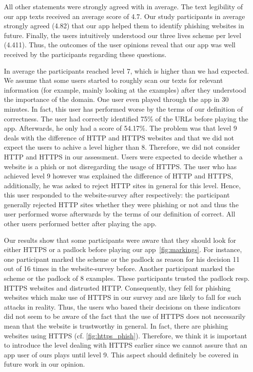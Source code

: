 \begin{description}[leftmargin=0cm]
	All other statements were strongly agreed with in average.
	The text legibility of our app texts received an average score of 4.7.
	Our study participants in average strongly agreed (4.82) that our app helped them to identify phishing websites in future.
	Finally, the users intuitively understood our three lives scheme per level (4.411).
	Thus, the outcomes of the user opinions reveal that our app was well received by the participants regarding these questions.
	\item[Achieved Levels:] In average the participants reached level 7, which is higher than we had expected.
	We assume that some users started to roughly scan our texts for relevant information (for example, mainly looking at the examples) after they understood the importance of the domain.
	One user even played through the app in 30 minutes.
	In fact, this user has performed worse by the terms of our definition of correctness.
	The user had correctly identified 75\% of the URLs before playing the app.
	Afterwards, he only had a score of 54.17\%.
	The problem was that level 9 deals with the difference of HTTP and HTTPS websites and that we did not expect the users to achive a level higher than 8.
	Therefore, we did not consider HTTP and HTTPS in our assessment.
	Users were expected to decide whether a website is a phish or not disregarding the usage of HTTPS.
	The user who has achieved level 9 however was explained the difference of HTTP and HTTPS, additionally, he was asked to reject HTTP sites in general for this level.
	Hence, this user responded to the website-survey after respectively: the participant generally rejected HTTP sites whether they were phishing or not and thus the user performed worse afterwards by the terms of our definition of correct.
	All other users performed better after playing the app.
	\item[HTTPS and Padlock:] Our results show that some participants were aware that they should look for either HTTPS or a padlock before playing our app~\autoref{fig:markings}.
	For instance, one participant marked the scheme or the padlock as reason for his decision 11 out of 16 times in the website-survey before. 
	Another participant marked the scheme or the padlock of 8 examples.
	These participants trusted the padlock resp. HTTPS websites and distrusted HTTP.
	Consequently, they fell for phishing websites which make use of HTTPS in our survey and are likely to fall for such attacks in reality.
	Thus, the users who based their decisions on these indicators did not seem to be aware of the fact that the use of HTTPS does not necessarily mean that the website is trustworthy in general.
	In fact, there are phishing websites using HTTPS (cf. \autoref{fig:https_phish}). 
	Therefore, we think it is important to introduce the level dealing with HTTPS earlier since we cannot assure that an app user of ours plays until level 9.
	This aspect should definitely be covered in future work in our opinion.
	
\end{description}
